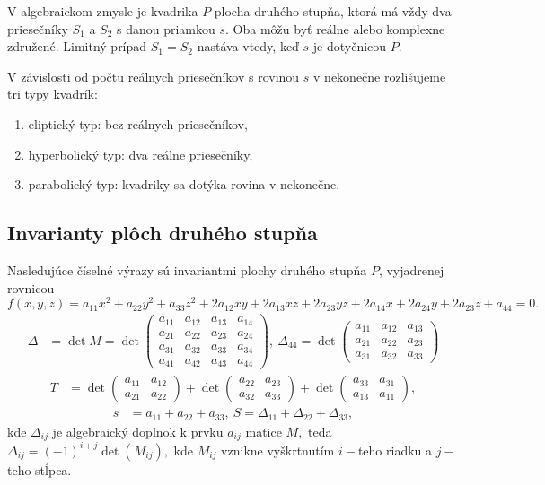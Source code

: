 V algebraickom zmysle je kvadrika $P$ plocha druhého stupňa, ktorá má vždy dva priesečníky $S_1$ a $S_2$ s danou priamkou $s$. Oba môžu byť reálne alebo komplexne združené. Limitný prípad $S_1 = S_2$ nastáva vtedy, keď $s$ je dotyčnicou $P$.

V závislosti od počtu reálnych priesečníkov s rovinou $s$ v nekonečne rozlišujeme tri typy kvadrík:
\begin{enumerate}
\item eliptický typ: bez reálnych priesečníkov,
\item hyperbolický typ: dva reálne priesečníky,
\item parabolický typ: kvadriky sa dotýka rovina v nekonečne.
\end{enumerate}
\subsection{Invarianty plôch druhého stupňa}
Nasledujúce číselné výrazy sú invariantmi plochy druhého stupňa $P$, vyjadrenej rovnicou 
\[ f(x, y, z) = a_{11}x^2 + a_{22}y^2 + a_{33}z^2 + 2a_{12}xy + 2a_{13}xz + 2a_{23}yz + 2a_{14}x + 2a_{24}y + 2a_{23}z + a_{44} = 0. \]
\begin{align*}
\Delta &= \det M = \det \begin{pmatrix} 
a_{11} & a_{12} & a_{13} & a_{14} \\ 
a_{21} & a_{22} & a_{23} & a_{24} \\
a_{31} & a_{32} & a_{33} & a_{34} \\
a_{41} & a_{42} & a_{43} & a_{44}
\end{pmatrix}, \
\Delta_{44} = \det \begin{pmatrix} 
a_{11} & a_{12} & a_{13} \\ 
a_{21} & a_{22} & a_{23} \\ 
a_{31} & a_{32} & a_{33} 
\end{pmatrix}
\end{align*}
\begin{align*}
T &= \det \begin{pmatrix} 
a_{11} & a_{12} \\ 
a_{21} & a_{22} 
\end{pmatrix} + \det \begin{pmatrix} 
a_{22} & a_{23} \\ 
a_{32} & a_{33} 
\end{pmatrix} + \det \begin{pmatrix} 
a_{33} & a_{31} \\ 
a_{13} & a_{11} 
\end{pmatrix}, 
\end{align*}
\begin{align*}
s &= a_{11} + a_{22} + a_{33}, \ S = \Delta_{11} + \Delta_{22} + \Delta_{33}, 
\end{align*}
kde $ \Delta_{ij} $ je algebraický doplnok k prvku $a_{ij}$ matice $M, $ teda $\Delta_{ij} = (-1)^{i+j} \det(M_{ij}), $ kde $M_{ij}$ vznikne vyškrtnutím $i-$teho riadku a $j-$teho stĺpca.

